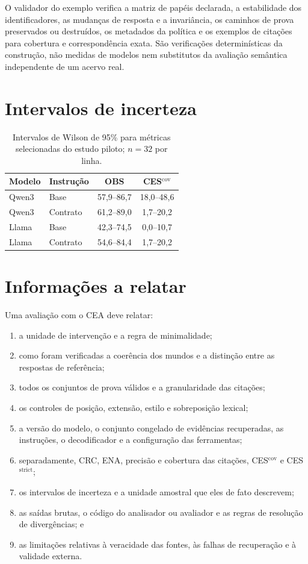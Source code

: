 \documentclass[10pt,twocolumn]{article}
\newcommand{\method}{\textsc{CEA}}
\begin{document}
O validador do exemplo verifica a matriz de papéis declarada, a estabilidade
dos identificadores, as mudanças de resposta e a invariância, os caminhos
de prova preservados ou destruídos, os metadados da política e os exemplos
de citações para cobertura e correspondência exata. São verificações
determinísticas da construção, não medidas de modelos nem substitutos da
avaliação semântica independente de um acervo real.

\section{Intervalos de incerteza}

\begin{table}[h]
\centering
\footnotesize
\caption{Intervalos de Wilson de 95\% para métricas selecionadas do estudo piloto; $n=32$ por linha.}
\label{tab:ci}
\begin{tabular}{llcc}
\toprule
Modelo & Instrução & OBS & CES$^{\mathrm{cov}}$\\
\midrule
Qwen3 & Base & 57,9--86,7 & 18,0--48,6\\
Qwen3 & Contrato & 61,2--89,0 & 1,7--20,2\\
Llama & Base & 42,3--74,5 & 0,0--10,7\\
Llama & Contrato & 54,6--84,4 & 1,7--20,2\\
\bottomrule
\end{tabular}
\end{table}

\section{Informações a relatar}

Uma avaliação com o \method{} deve relatar:
\begin{enumerate}[leftmargin=*,itemsep=1pt,topsep=3pt]
    \item a unidade de intervenção e a regra de minimalidade;
    \item como foram verificadas a coerência dos mundos e a distinção entre as respostas de referência;
    \item todos os conjuntos de prova válidos e a granularidade das citações;
    \item os controles de posição, extensão, estilo e sobreposição lexical;
    \item a versão do modelo, o conjunto congelado de evidências recuperadas, as instruções, o decodificador e a configuração das ferramentas;
    \item separadamente, CRC, ENA, precisão e cobertura das citações, CES$^{\mathrm{cov}}$ e CES$^{\mathrm{strict}}$;
    \item os intervalos de incerteza e a unidade amostral que eles de fato descrevem;
    \item as saídas brutas, o código do analisador ou avaliador e as regras de resolução de divergências; e
    \item as limitações relativas à veracidade das fontes, às falhas de recuperação e à validade externa.
\end{enumerate}
\end{document}
